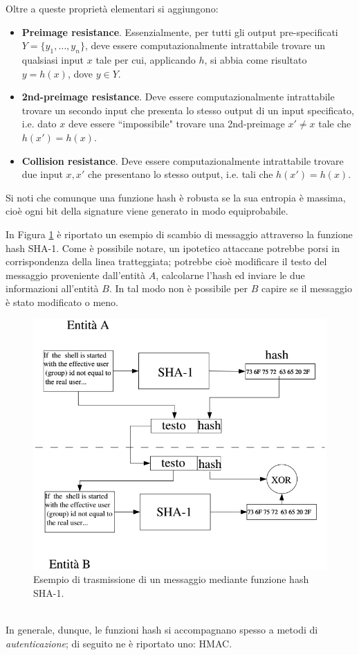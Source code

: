 Oltre a queste proprietà elementari si aggiungono:
\begin{itemize}
	\item \textbf{Preimage resistance}. Essenzialmente, per tutti gli output pre-specificati $Y=\{y_1,\dots,y_n\}$, deve essere computazionalmente intrattabile trovare un qualsiasi input $x$ tale per cui, applicando $h$, si abbia come risultato $y=h(x)$, dove $y\in Y$.
	\item \textbf{2nd-preimage resistance}. Deve essere computazionalmente intrattabile trovare un secondo input che presenta lo stesso output di un input specificato, i.e. dato $x$ deve essere \textquotedblleft impossibile" trovare una 2nd-preimage $x'\neq x$ tale che $h(x') = h(x)$.
	\item \textbf{Collision resistance}. Deve essere computazionalmente intrattabile trovare due input $x, x'$ che presentano lo stesso output, i.e. tali che $h(x') = h(x)$.
\end{itemize}
Si noti che comunque una funzione hash è robusta se la sua entropia è massima, cioè ogni bit della signature viene generato in modo equiprobabile. 

In Figura \ref{img:SHA_example} è riportato un esempio di scambio di messaggio attraverso la funzione hash SHA-1. Come è possibile notare, un ipotetico attaccane potrebbe porsi in corrispondenza della linea tratteggiata; potrebbe cioè modificare il testo del messaggio proveniente dall'entità $A$, calcolarne l'hash ed inviare le due informazioni all'entità $B$. In tal modo non è possibile per $B$ capire se il messaggio è stato modificato o meno.
\begin{figure}[htbp]
	\centering
	\includegraphics[scale = 0.5]{images/SHA_example}
	\caption{Esempio di trasmissione di un messaggio mediante funzione hash SHA-1.}
	\label{img:SHA_example}
\end{figure}\\
In generale, dunque, le funzioni hash si accompagnano spesso a metodi di \textit{autenticazione}; di seguito ne è riportato uno: HMAC. 

